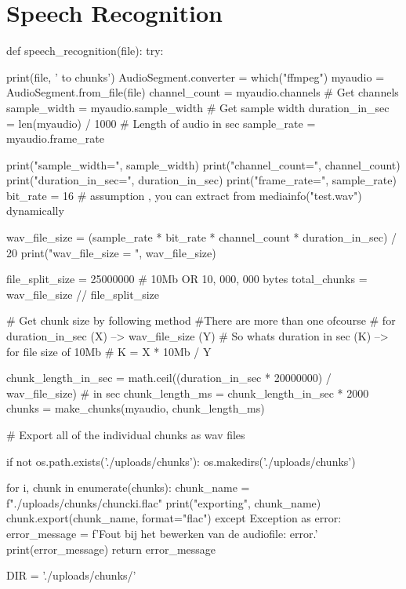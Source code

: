 \section{Speech Recognition}
\label{bijlage:speech_recognition}
\begin{python}
def speech_recognition(file):
    try:

        print(file, ' to chunks')
        AudioSegment.converter = which("ffmpeg")
        myaudio = AudioSegment.from_file(file)
        channel_count = myaudio.channels  # Get channels
        sample_width = myaudio.sample_width  # Get sample width
        duration_in_sec = len(myaudio) / 1000  # Length of audio in sec
        sample_rate = myaudio.frame_rate

        print("sample_width=", sample_width)
        print("channel_count=", channel_count)
        print("duration_in_sec=", duration_in_sec)
        print("frame_rate=", sample_rate)
        bit_rate = 16  # assumption , you can extract from mediainfo("test.wav") dynamically

        wav_file_size = (sample_rate * bit_rate * channel_count * duration_in_sec) / 20
        print("wav_file_size = ", wav_file_size)

        file_split_size = 25000000  # 10Mb OR 10, 000, 000 bytes
        total_chunks = wav_file_size // file_split_size

        # Get chunk size by following method #There are more than one ofcourse
        # for  duration_in_sec (X) -->  wav_file_size (Y)
        # So   whats duration in sec  (K) --> for file size of 10Mb
        #  K = X * 10Mb / Y

        chunk_length_in_sec = math.ceil((duration_in_sec * 20000000) / wav_file_size)  # in sec
        chunk_length_ms = chunk_length_in_sec * 2000
        chunks = make_chunks(myaudio, chunk_length_ms)

        # Export all of the individual chunks as wav files

        if not os.path.exists('./uploads/chunks'):
            os.makedirs('./uploads/chunks')

        for i, chunk in enumerate(chunks):
            chunk_name = f"./uploads/chunks/chunck{i}.flac"
            print("exporting", chunk_name)
            chunk.export(chunk_name, format="flac")
    except Exception as error:
        error_message = f'Fout bij het bewerken van de audiofile: {error}.'
        print(error_message)
        return error_message

    DIR = './uploads/chunks/'


\end{python}
